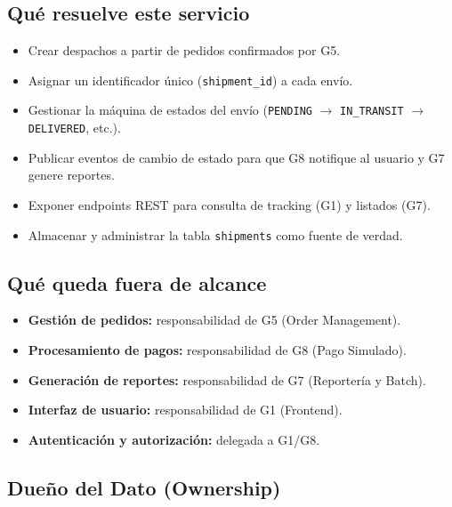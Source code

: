 \documentclass[11pt, a4paper]{article}
\begin{document}
\subsection{Qué resuelve este servicio}

\begin{itemize}[noitemsep]
  \item Crear despachos a partir de pedidos confirmados por G5.
  \item Asignar un identificador único (\texttt{shipment\_id}) a cada envío.
  \item Gestionar la máquina de estados del envío (\texttt{PENDING} $\rightarrow$ \texttt{IN\_TRANSIT} $\rightarrow$ \texttt{DELIVERED}, etc.).
  \item Publicar eventos de cambio de estado para que G8 notifique al usuario y G7 genere reportes.
  \item Exponer endpoints REST para consulta de tracking (G1) y listados (G7).
  \item Almacenar y administrar la tabla \texttt{shipments} como fuente de verdad.
\end{itemize}

\subsection{Qué queda fuera de alcance}

\begin{itemize}[noitemsep]
  \item \textbf{Gestión de pedidos:} responsabilidad de G5 (Order Management).
  \item \textbf{Procesamiento de pagos:} responsabilidad de G8 (Pago Simulado).
  \item \textbf{Generación de reportes:} responsabilidad de G7 (Reportería y Batch).
  \item \textbf{Interfaz de usuario:} responsabilidad de G1 (Frontend).
  \item \textbf{Autenticación y autorización:} delegada a G1/G8.
\end{itemize}

\subsection{Dueño del Dato (Ownership)}
\end{document}

